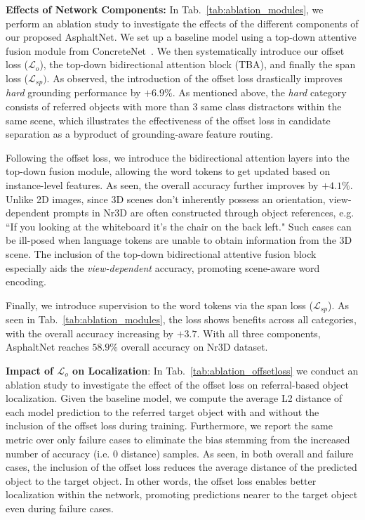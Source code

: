 \documentclass[10pt,twocolumn,letterpaper]{article}
\begin{document}
\noindent \textbf{Effects of Network Components:}  In Tab.~\ref{tab:ablation_modules}, we perform an ablation study to investigate the effects of the different components of our proposed AsphaltNet. We set up a baseline model using a top-down attentive fusion module from ConcreteNet~\cite{unal2023ways}. We then systematically introduce our offset loss ($\mathcal{L}_o$), the top-down bidirectional attention block (TBA), and finally the span loss ($\mathcal{L}_{sp})$. As observed, the introduction of the offset loss drastically improves \textit{hard} grounding performance by $+6.9\%$. As mentioned above, the \textit{hard} category consists of referred objects with more than 3 same class distractors within the same scene, which illustrates the effectiveness of the offset loss in candidate separation as a byproduct of grounding-aware feature routing.

Following the offset loss, we introduce the bidirectional attention layers into the top-down fusion module, allowing the word tokens to get updated based on instance-level features. As seen, the overall accuracy further improves by $+4.1\%$. Unlike 2D images, since 3D scenes don't inherently possess an orientation, view-dependent prompts in Nr3D are often constructed through object references, e.g. ``If you looking at the whiteboard it's the chair on the back left." Such cases can be ill-posed when language tokens are unable to obtain information from the 3D scene. The inclusion of the top-down bidirectional attentive fusion block especially aids the \textit{view-dependent} accuracy, promoting scene-aware word encoding.

Finally, we introduce supervision to the word tokens via the span loss ($\mathcal{L}_{sp}$). As seen in Tab.~\ref{tab:ablation_modules}, the loss shows benefits across all categories, with the overall accuracy increasing by $+3.7$. With all three components, AsphaltNet reaches $58.9\%$ overall accuracy on Nr3D dataset.

\noindent \textbf{Impact of $\mathcal{L}_o$ on Localization}: In Tab.~\ref{tab:ablation_offsetloss} we conduct an ablation study to investigate the effect of the offset loss on referral-based object localization. Given the baseline model, we compute the average L2 distance of each model prediction to the referred target object with and without the inclusion of the offset loss during training.
Furthermore, we report the same metric over only failure cases to eliminate the bias stemming from the increased number of accuracy (i.e. 0 distance) samples. As seen, in both overall and failure cases, the inclusion of the offset loss reduces the average distance of the predicted object to the target object. In other words, the offset loss enables better localization within the network, promoting predictions nearer to the target object even during failure cases.
\end{document}
